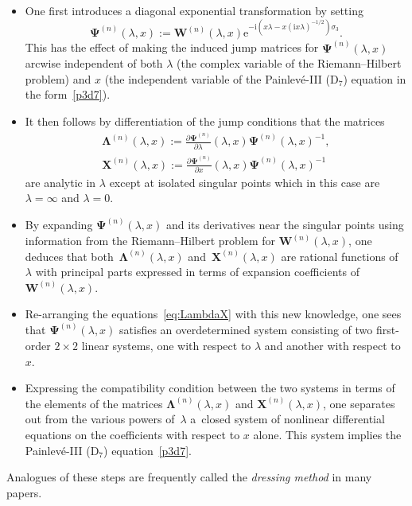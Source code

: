 \begin{itemize}\itemsep=0pt
\item One first introduces a diagonal exponential transformation by setting
\begin{equation*}
\boldsymbol{\Psi}^{(n)}(\lambda,x):=\mathbf{W}^{(n)}(\lambda,x)\mathrm{e}^{-\mathrm{i} (x\lambda-x(\mathrm{i} x\lambda)^{-1/2})\sigma_3}.
\end{equation*}
This has the effect of making the induced jump matrices for $\boldsymbol{\Psi}^{(n)}(\lambda,x)$ arcwise independent of both $\lambda$ (the complex variable of the Riemann--Hilbert problem) and $x$ (the independent variable of the Painlev\'e-III (D$_7$) equation in the form~\eqref{p3d7}).
\item It then follows by differentiation of the jump conditions that the matrices
\begin{gather}
\boldsymbol{\Lambda}^{(n)}(\lambda,x):=\frac{\partial\boldsymbol{\Psi}^{(n)}}{\partial\lambda}(\lambda,x)\boldsymbol{\Psi}^{(n)}(\lambda,x)^{-1},\nonumber\\
 \mathbf{X}^{(n)}(\lambda,x):=\frac{\partial\boldsymbol{\Psi}^{(n)}}{\partial x}(\lambda,x)\boldsymbol{\Psi}^{(n)}(\lambda,x)^{-1}
 \label{eq:LambdaX}
 \end{gather}
are analytic in $\lambda$ except at isolated singular points which in this case are $\lambda=\infty$ and $\lambda=0$.
\item By expanding $\boldsymbol{\Psi}^{(n)}(\lambda,x)$ and its derivatives near the singular points using information from the Riemann--Hilbert problem for $\mathbf{W}^{(n)}(\lambda,x)$, one deduces that both~$\boldsymbol{\Lambda}^{(n)}(\lambda,x)$ and~$\mathbf{X}^{(n)}(\lambda,x)$ are rational functions of $\lambda$ with principal parts expressed in terms of expansion coefficients of $\mathbf{W}^{(n)}(\lambda,x)$.
\item Re-arranging the equations~\eqref{eq:LambdaX} with this new knowledge, one sees that $\boldsymbol{\Psi}^{(n)}(\lambda,x)$ satisfies an overdetermined system consisting of two first-order $2\times 2$ linear systems, one with respect to $\lambda$ and another with respect to $x$.
\item Expressing the compatibility condition between the two systems in terms of the elements of the matrices $\boldsymbol{\Lambda}^{(n)}(\lambda,x)$ and $\mathbf{X}^{(n)}(\lambda,x)$, one separates out from the various powers of~$\lambda$ a~closed system of nonlinear differential equations on the coefficients with respect to $x$ alone. This system implies the Painlev\'e-III (D$_7$) equation~\eqref{p3d7}.
\end{itemize}
Analogues of these steps are frequently called the \emph{dressing method} in many papers.

